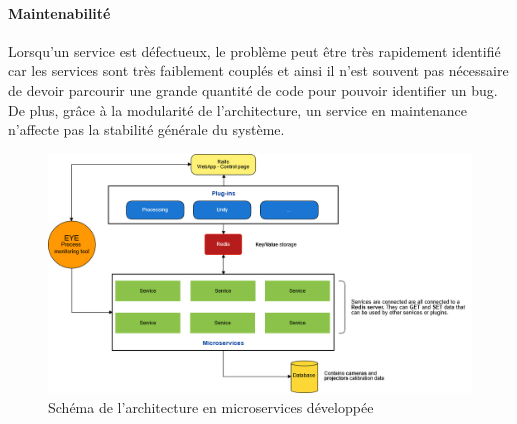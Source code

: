 \paragraph{Maintenabilité} Lorsqu'un service est défectueux, le problème peut être très rapidement identifié car les services sont très faiblement couplés et ainsi il n'est souvent pas nécessaire de devoir parcourir une grande quantité de code pour pouvoir identifier un bug. De plus, grâce à la modularité de l'architecture, un service en maintenance n'affecte pas la stabilité générale du système.

\begin{figure}[H]
\centering
\includegraphics[width=\linewidth]{images/archi3}
\caption{Schéma de l'architecture en microservices développée}
\label{fig:microarchi}
\end{figure} 

